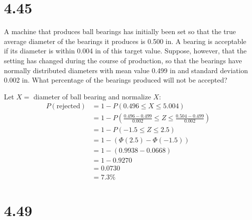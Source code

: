 \documentclass[letterpaper,12pt,fleqn]{article}
\renewcommand{\O}{\Phi}
\begin{document}
\section*{4.45}

A machine that produces ball bearings has initially been set so that the true average diameter of the bearings it produces is
0.500 in.  A bearing is acceptable if its diameter is within 0.004 in of this target value.  Suppose, however, that the
setting has changed during the course of production, so that the bearings have normally distributed diameters with mean value
0.499 in and standard deviation 0.002 in.  What percentage of the bearings produced will not be accepted?

Let \(X=\) diameter of ball bearing and normalize \(X\):
\begin{align*}
  P(\text{rejected}) &= 1-P(0.496\le X\le5.004) \\
  &= 1-P\left(\frac{0.496-0.499}{0.002}\le Z\le\frac{0.504-0.499}{0.002}\right) \\
  &= 1-P(-1.5\le Z\le2.5) \\
  &= 1-(\O(2.5)-\O(-1.5)) \\
  &= 1-(0.9938-0.0668) \\
  &= 1-0.9270 \\
  &= 0.0730 \\
  &= 7.3\%
\end{align*}

\section*{4.49}
\end{document}
